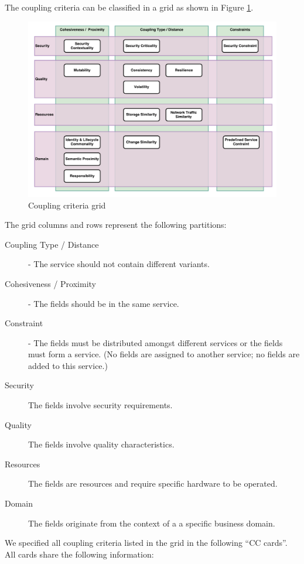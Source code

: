The coupling criteria can be classified in a grid as shown in Figure \ref{fig:cc_grid}.

\begin{figure}[H]
	\includegraphics[scale=0.5]{diagrams/CouplingCatalog.pdf}
	\caption{Coupling criteria grid}
	\label{fig:cc_grid}
\end{figure}

The grid columns and rows represent the following partitions:

\begin{description}
	\item[Coupling Type / Distance] - The service should not contain different variants.
	\item[Cohesiveness / Proximity] - The fields should be in the same service.
	\item[Constraint] - The fields must be distributed amongst different services or the fields must form a service. (No fields are assigned to another service; no fields are added to this service.)
	\item[Security] The fields involve security requirements.
	\item[Quality] The fields involve quality characteristics.
	\item[Resources] The fields are resources and require specific hardware to be operated.
	\item[Domain] The fields originate from the context of a a specific business domain.
\end{description}

We specified all coupling criteria listed in the grid in the following \enquote{CC cards}. All cards share the following information:

